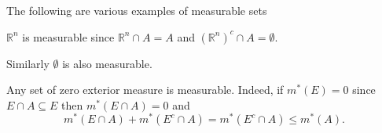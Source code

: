 \documentclass[12pt,oneside]{book}
\numberwithin{table}{section}
\numberwithin{equation}{section}
\numberwithin{figure}{section}
\newcommand{\R}{\mathbb{R}}
\newcommand{\ext}[1]{m^* \! \left( #1 \right)}
\begin{document}
\begin{example} \label{exe:measurable sets}
	The following are various examples of measurable sets
	\begin{points}
	\item \( \R^n \) is measurable since \( \R^n \cap A = A \) and \( (\R^n)^c \cap A = \emptyset \).
	\item Similarly \( \emptyset \) is also measurable.
	\item Any set of zero exterior measure is measurable. Indeed, if \( \ext{E} = 0 \) since \( E \cap A \subseteq E \) then \( \ext{E \cap A} = 0 \) and
		\begin{equation*}
			\ext{E \cap A} + \ext{E^c \cap A} = \ext{E^c \cap A} \leq \ext{A}.
		\end{equation*}
	\end{points}
\end{example}
\end{document}
